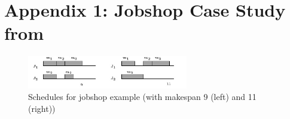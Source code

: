 \documentclass{llncs}
\newcommand{\Ko}{K}
\newcommand{\IM}{\mathit{IM}}
\newcommand{\imitator}{\textsc{Imitator}}
\newcommand{\commentaire}[1]{\textcolor{red}{\textbf{$\Leftarrow$  #1 $\Rightarrow$}}}
\begin{document}








\newpage


\appendix

\section*{Appendix 1: Jobshop Case Study from \cite{AM02}}






\begin{figure}[ht!]
	\centering
 		\includegraphics[width=7cm]{./figures/scheduling.jpg}
	\caption{Schedules for jobshop example (with makespan 9 (left) and 11 (right)) \cite{AM02}}
	\label{fig:schedules_maler}
\end{figure}
\end{document}
